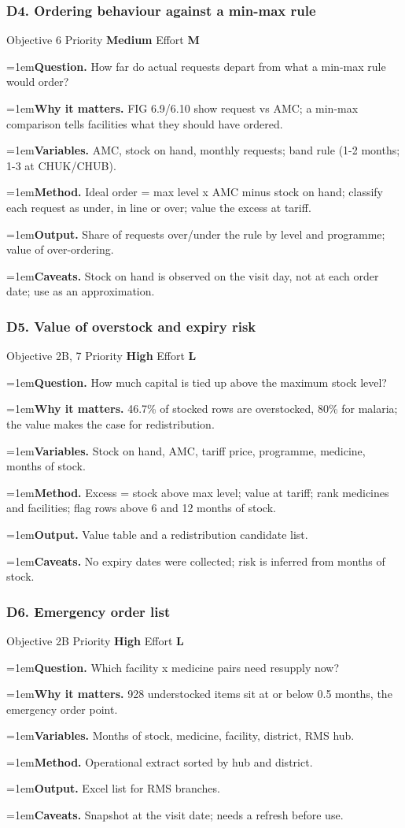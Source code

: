 \documentclass[10pt,a4paper]{article}
\newcommand{\field}[2]{\par\hangindent=1em\textbf{#1.} #2}
\begin{document}
\subsubsection*{D4. Ordering behaviour against a min-max rule}
{\footnotesize\color{gray} Objective 6 \textperiodcentered{} Priority \textbf{Medium} \textperiodcentered{} Effort \textbf{M}}
\field{Question}{How far do actual requests depart from what a min-max rule would order?}
\field{Why it matters}{FIG 6.9/6.10 show request vs AMC; a min-max comparison tells facilities what they should have ordered.}
\field{Variables}{AMC, stock on hand, monthly requests; band rule (1-2 months; 1-3 at CHUK/CHUB).}
\field{Method}{Ideal order = max level x AMC minus stock on hand; classify each request as under, in line or over; value the excess at tariff.}
\field{Output}{Share of requests over/under the rule by level and programme; value of over-ordering.}
\field{Caveats}{Stock on hand is observed on the visit day, not at each order date; use as an approximation.}
\subsubsection*{D5. Value of overstock and expiry risk}
{\footnotesize\color{gray} Objective 2B, 7 \textperiodcentered{} Priority \textbf{High} \textperiodcentered{} Effort \textbf{L}}
\field{Question}{How much capital is tied up above the maximum stock level?}
\field{Why it matters}{46.7\% of stocked rows are overstocked, 80\% for malaria; the value makes the case for redistribution.}
\field{Variables}{Stock on hand, AMC, tariff price, programme, medicine, months of stock.}
\field{Method}{Excess = stock above max level; value at tariff; rank medicines and facilities; flag rows above 6 and 12 months of stock.}
\field{Output}{Value table and a redistribution candidate list.}
\field{Caveats}{No expiry dates were collected; risk is inferred from months of stock.}
\subsubsection*{D6. Emergency order list}
{\footnotesize\color{gray} Objective 2B \textperiodcentered{} Priority \textbf{High} \textperiodcentered{} Effort \textbf{L}}
\field{Question}{Which facility x medicine pairs need resupply now?}
\field{Why it matters}{928 understocked items sit at or below 0.5 months, the emergency order point.}
\field{Variables}{Months of stock, medicine, facility, district, RMS hub.}
\field{Method}{Operational extract sorted by hub and district.}
\field{Output}{Excel list for RMS branches.}
\field{Caveats}{Snapshot at the visit date; needs a refresh before use.}
\end{document}
